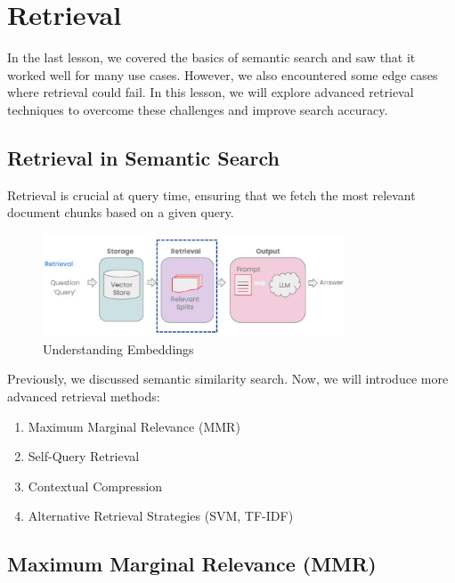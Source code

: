 \documentclass{article}
\begin{document}
\section{Retrieval}

In the last lesson, we covered the basics of semantic search and saw that it worked well for many use cases. However, we also encountered some edge cases where retrieval could fail. In this lesson, we will explore advanced retrieval techniques to overcome these challenges and improve search accuracy.

\subsection{Retrieval in Semantic Search}

Retrieval is crucial at query time, ensuring that we fetch the most relevant document chunks based on a given query.

\begin{figure}[H]
    \centering
    \includegraphics[width=0.8\textwidth]{images/langchain_chat_with_your_data_012.png}
    \caption{Understanding Embeddings}
    \label{fig:understanding_embeddings}
\end{figure}

Previously, we discussed semantic similarity search. Now, we will introduce more advanced retrieval methods:

\begin{enumerate}
    \item Maximum Marginal Relevance (MMR)
    \item Self-Query Retrieval
    \item Contextual Compression
    \item Alternative Retrieval Strategies (SVM, TF-IDF)
\end{enumerate}

\subsection{Maximum Marginal Relevance (MMR)}
\end{document}
